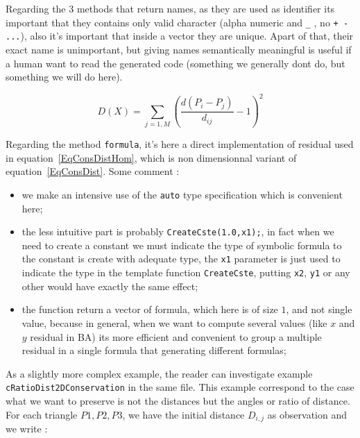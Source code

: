 Regarding the $3$ methods that  return names, as they are used as \CPP identifier
its important that they contains only valid character (alpha numeric and {\tt\_} ,
no {\tt + - ...}),  also it's important that  inside a vector they are unique.
Apart of that, their exact name is unimportant, but giving names semantically
meaningful is useful if a human want to read the generated code (something we
generally dont do, but something we will do here).

\begin{equation}
      D(X) = \sum_{j=1,M} (\frac{d(P_i-P_j)}{d_{ij}} - 1)^2  \label{EqConsDistHom}
\end{equation}

Regarding the method  {\tt formula}, it's here a direct implementation 
of residual used in  equation~\ref{EqConsDistHom}, which
is non dimensionnal variant of equation~\ref{EqConsDist}. Some comment :

\begin{itemize}
   \item we make an intensive use of the {\tt auto} type specification which
         is convenient here;

   \item the less intuitive part is probably {\tt  CreateCste(1.0,x1);},  in fact
         when we need to create a constant  we must indicate the type of symbolic
         formula to the constant is create with adequate type, the {\tt x1} parameter
         is just used to indicate the type in the template function {\tt CreateCste},
         putting {\tt x2}, {\tt y1} or any other would have exactly the same effect;

   \item the function return a vector of formula, which here is of size $1$, and not
         single value, because in general, when we want to compute several values (like
         $x$ and $y$ residual in BA)  its more efficient and convenient to group 
         a multiple residual in a single formula that generating different formulas;

\end{itemize}

As a slightly more complex example, the reader can investigate example {\tt cRatioDist2DConservation}
in the same file. This example correspond to the case what we want to preserve is not the distances
but the angles or ratio of distance. For each triangle $P1,P2,P3$, we have the initial 
distance $D_{i,j}$ as observation and  we write :

